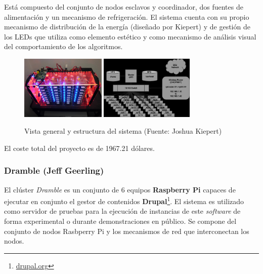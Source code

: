 Está compuesto del conjunto de nodos esclavos y coordinador, dos fuentes de alimentación y un mecanismo de refrigeración. El sistema cuenta con su propio mecanismo de distribución de la energía (diseñado por Kiepert) y de gestión de los LEDs que utiliza como elemento estético y como mecanismo de análisis visual del comportamiento de los algoritmos.


\begin{figure}[H]
	\centering
	\includegraphics[width=0.36\textwidth]{Chapter1/Figures/kiepert-main}
	\includegraphics[width=0.4\textwidth]{Chapter1/Figures/structure.png}
	\caption[RPiCluster]{Vista general y estructura del sistema (Fuente: Joshua Kiepert)}
	\label{kiepert:structure}
\end{figure}

El coste total del proyecto es de 1967.21 dólares.

\subsubsection{Dramble (Jeff Geerling)}

El clúster \textit{Dramble} es un conjunto de 6 equipos \textbf{Raspberry Pi} capaces de ejecutar en conjunto el gestor de contenidos \textbf{Drupal}\footnote{\href{https://www.drupal.org/}{drupal.org}}. El sistema es utilizado como servidor de pruebas para la ejecución de instancias de este \textit{software} de forma experimental o durante demonstraciones en público\cite{geerlingraspberry}. Se compone del conjunto de nodos Rasbperry Pi y los mecanismos de red que interconectan los nodos.

